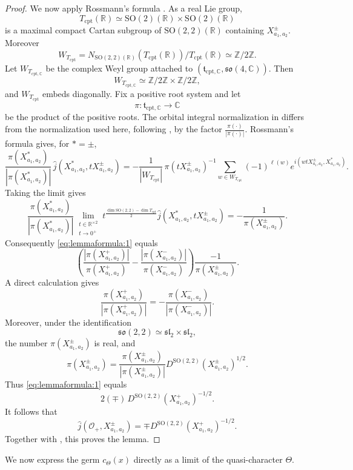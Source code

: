 \documentclass[12pt]{amsart}
\numberwithin{equation}{subsection}
\newcommand{\BC}{{\mathbb {C}}}
\newcommand{\BR}{{\mathbb {R}}}
\newcommand{\BZ}{{\mathbb {Z}}}
\newcommand{\CO}{{\mathcal {O}}}
\newcommand{\Fl}{{\mathfrak {l}}}
\newcommand{\Fo}{{\mathfrak {o}}}
\newcommand{\Fs}{{\mathfrak {s}}}
\newcommand{\Ft}{{\mathfrak {t}}}
\newcommand{\SO}{{\mathrm{SO}}}
\def\cpt{\mathrm{cpt}}
\def\SO{\mathrm{SO}}
\begin{document}
\begin{proof}
We now apply Rossmann's formula \cite[p.~217, (15)]{MR508985}. As a real Lie
group,
\[
T_\cpt(\BR)\simeq \SO(2)(\BR)\times \SO(2)(\BR)
\]
is a maximal compact Cartan subgroup of $\SO(2,2)(\BR)$ containing
$X^\pm_{a_1,a_2}$. Moreover
\[
W_{T_\cpt}
=
N_{\SO(2,2)(\BR)}(T_\cpt(\BR))/T_\cpt(\BR)
\simeq \BZ/2\BZ.
\]
Let $W_{T_{\cpt,\BC}}$ be the complex Weyl group attached to
$(\Ft_{\cpt,\BC},\Fs\Fo(4,\BC))$. Then
\[
W_{T_{\cpt,\BC}}\simeq \BZ/2\BZ\times \BZ/2\BZ,
\]
and $W_{T_\cpt}$ embeds diagonally. Fix a positive root system and let
\[
\pi:\Ft_{\cpt,\BC}\to \BC
\]
be the product of the positive roots. The orbital integral normalization in
\cite[(1)]{MR508985} differs from the normalization used here, following
\cite[\S 1.8]{beuzart2015local}, by the factor 
$
\frac{\pi(\cdot)}{|\pi(\cdot)|}.
$
Rossmann's formula gives, for $*= \pm$,
\[
\frac{\pi(X^*_{a_1,a_2})}{|\pi(X^*_{a_1,a_2})|}
\,
\widehat{j}(X^*_{a_1,a_2},tX^\pm_{a_1,a_2})
=
-\frac{1}{|W_{T_\cpt}|}\,
\pi(tX^\pm_{a_1,a_2})^{-1}
\sum_{w\in W_{T_\cpt}}
(-1)^{\ell(w)}
e^{i(wtX^\pm_{a_1,a_2},X^*_{a_1,a_2})}.
\]
Taking the limit gives
\[
\frac{\pi(X^*_{a_1,a_2})}{|\pi(X^*_{a_1,a_2})|}
\lim_{\substack{t\in \BR^{\times 2}\\ t\to 0^+}}
t^{\frac{\dim \SO(2,2)-\dim T_\cpt}{2}}
\widehat{j}(X^*_{a_1,a_2},tX^\pm_{a_1,a_2})
=
-\frac{1}{\pi(X^\pm_{a_1,a_2})}.
\]
Consequently \eqref{eq:lemmaformula:1} equals
\[
\left(
\frac{|\pi(X^+_{a_1,a_2})|}{\pi(X^+_{a_1,a_2})}
-
\frac{|\pi(X^-_{a_1,a_2})|}{\pi(X^-_{a_1,a_2})}
\right)
\frac{-1}{\pi(X^\pm_{a_1,a_2})}.
\]
A direct calculation gives
\[
\frac{\pi(X^+_{a_1,a_2})}{|\pi(X^+_{a_1,a_2})|}
=
-
\frac{\pi(X^-_{a_1,a_2})}{|\pi(X^-_{a_1,a_2})|}.
\]
Moreover, under the identification
\[
\Fs\Fo(2,2)\simeq \Fs\Fl_2\times \Fs\Fl_2,
\]
the number $\pi(X^\pm_{a_1,a_2})$ is real, and
\[
\pi(X^\pm_{a_1,a_2})
=
\frac{\pi(X^\pm_{a_1,a_2})}{|\pi(X^\pm_{a_1,a_2})|}
D^{\SO(2,2)}(X^\pm_{a_1,a_2})^{1/2}.
\]
Thus \eqref{eq:lemmaformula:1} equals
\[
2(\mp)\,D^{\SO(2,2)}(X^+_{a_1,a_2})^{-1/2}.
\]
It follows that
\[
\widehat{j}(\CO_+,X^\pm_{a_1,a_2})
=
\mp D^{\SO(2,2)}(X^+_{a_1,a_2})^{-1/2}.
\]
Together with \cite[(3.4.6)]{beuzart2015local}, this proves the lemma.
\end{proof}

We now express the germ $c_\Theta(x)$ directly as a limit of the
quasi-character $\Theta$.
\end{document}
